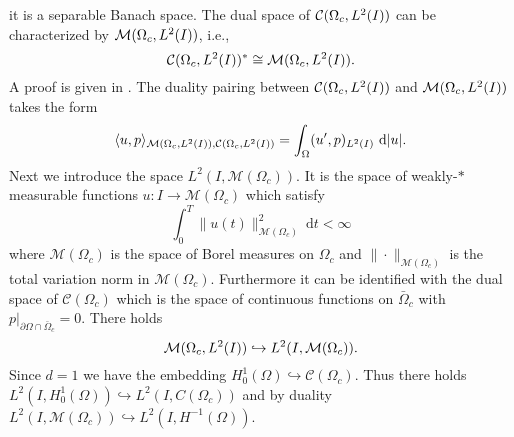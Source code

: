 it is a separable Banach space. The dual space of $\mathcal{C}(\Omega_c, L^{2}(I))$ can be characterized by $\mathcal{M}(\Omega_c, L^{2}(I))$, i.e.,
\[
\mathcal{C}(\Omega_c, L^{2}(I))^*\cong\mathcal{M}(\Omega_c, L^{2}(I)).
\]
A proof is given in \cite{Hensgen:1996}. The duality pairing between $\mathcal{C}(\Omega_c, L^{2}(I))$ and $\mathcal{M}(\Omega_c, L^{2}(I))$ takes the form
\[
\langle u,p\rangle_{\mathcal{M}(\Omega_c, L^{2}(I)),\mathcal{C}(\Omega_c, L^{2}(I))}=\int_\Omega(u',p)_{L^2(I)}~\mathrm d|u|.
\]
Next we introduce the space $L^2(I,\mathcal M(\Omega_c))$. It is the space of weakly-$*$ measurable functions $u\colon I\rightarrow \mathcal M(\Omega_c)$  which satisfy
\[
\int_0^T\|u(t)\|_{\mathcal M(\Omega_c)}^2~\mathrm dt<\infty
\]
where $\mathcal M(\Omega_c)$ is the space of Borel measures on $\Omega_c$ and $\|\cdot\|_{\mathcal M(\Omega_c)}$ is the total variation norm in $\mathcal M(\Omega_c)$. Furthermore it can be identified with the dual space of $\mathcal C(\Omega_c)$ which is the space of continuous functions on $\bar \Omega_c$ with $p|_{\partial\Omega\cap \bar \Omega_c}=0$.  There holds
\begin{equation}\label{embeddingM(L2)L2(M)}
\M\hookrightarrow L^2(I,\mathcal M(\Omega_c)).
\end{equation}
Since $d=1$ we have the embedding $H^1_0(\Omega)\hookrightarrow \mathcal C(\Omega_c)$. Thus there holds $L^2(I,H^1_0(\Omega))\hookrightarrow L^2(I,C(\Omega_c))$ and by duality
$L^2(I,\mathcal M(\Omega_c))\hookrightarrow L^2(I,H^{-1}(\Omega))$. 